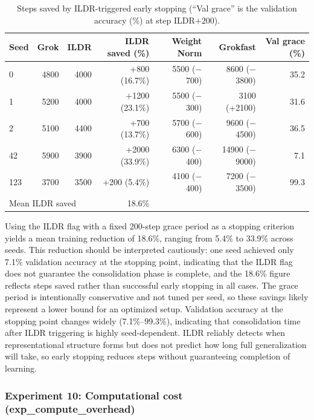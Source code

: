 \documentclass{article}
\begin{document}
\begin{table}[H]
\centering
\begin{tabular}{lrrrrrr}
\hline
Seed & Grok & ILDR & ILDR saved (\%) & Weight Norm & Grokfast & Val grace (\%) \\
\hline
0   & 4800 & 4000 & +800 (16.7\%)  & 5500 ($-$700)  & 8600 ($-$3800) & 35.2 \\
1   & 5200 & 4000 & +1200 (23.1\%) & 5500 ($-$300)  & 3100 (+2100)   & 31.6 \\
2   & 5100 & 4400 & +700 (13.7\%)  & 5700 ($-$600)  & 9600 ($-$4500) & 36.5 \\
42  & 5900 & 3900 & +2000 (33.9\%) & 6300 ($-$400)  & 14900 ($-$9000)& 7.1  \\
123 & 3700 & 3500 & +200 (5.4\%)   & 4100 ($-$400)  & 7200 ($-$3500) & 99.3 \\
\hline
\multicolumn{3}{l}{Mean ILDR saved} & 18.6\% & & & \\
\hline
\end{tabular}
\caption{Steps saved by ILDR-triggered early stopping (``Val grace'' is the validation accuracy (\%) at step ILDR$+200$).}
\label{tab:early_stopping}
\end{table}


Using the ILDR flag with a fixed 200-step grace period as a stopping criterion yields a mean training reduction of 18.6\%, ranging from 5.4\% to 33.9\% across seeds. This reduction should be interpreted cautiously: one seed achieved only 7.1\% validation accuracy at the stopping point, indicating that the ILDR flag does not guarantee the consolidation phase is complete, and the 18.6\% figure reflects steps saved rather than successful early stopping in all cases. The grace period is intentionally conservative and not tuned per seed, so these savings likely represent a lower bound for an optimized setup. Validation accuracy at the stopping point changes widely (7.1\%–99.3\%), indicating that consolidation time after ILDR triggering is highly seed-dependent. ILDR reliably detects when representational structure forms but does not predict how long full generalization will take, so early stopping reduces steps without guaranteeing completion of learning. 








\subsubsection{Experiment 10: Computational cost (exp\_compute\_overhead)}
\end{document}
